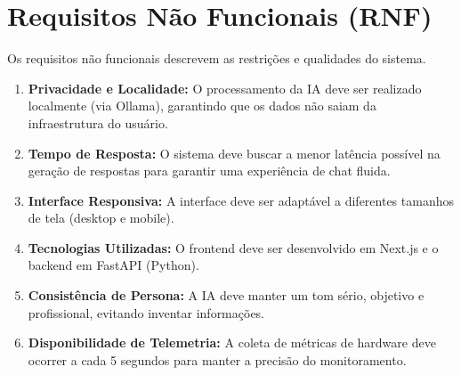 \documentclass{article}
\begin{document}
\section{Requisitos Não Funcionais (RNF)}
Os requisitos não funcionais descrevem as restrições e qualidades do sistema.

\begin{enumerate}[label=RNF\arabic*:, leftmargin=1.5cm]
    \item \textbf{Privacidade e Localidade:} O processamento da IA deve ser realizado localmente (via Ollama), garantindo que os dados não saiam da infraestrutura do usuário.
    \item \textbf{Tempo de Resposta:} O sistema deve buscar a menor latência possível na geração de respostas para garantir uma experiência de chat fluida.
    \item \textbf{Interface Responsiva:} A interface deve ser adaptável a diferentes tamanhos de tela (desktop e mobile).
    \item \textbf{Tecnologias Utilizadas:} O frontend deve ser desenvolvido em Next.js e o backend em FastAPI (Python).
    \item \textbf{Consistência de Persona:} A IA deve manter um tom sério, objetivo e profissional, evitando inventar informações.
    \item \textbf{Disponibilidade de Telemetria:} A coleta de métricas de hardware deve ocorrer a cada 5 segundos para manter a precisão do monitoramento.
\end{enumerate}
\end{document}
